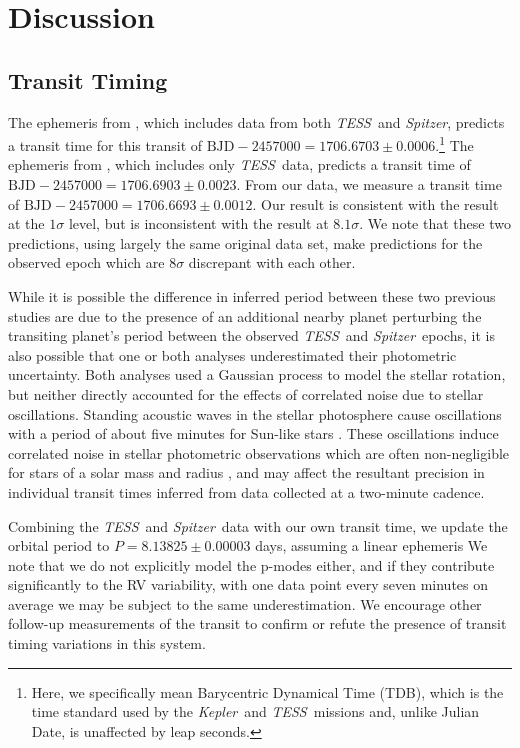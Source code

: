 \documentclass[twocolumn]{aastex63}
\newcommand{\kep}{{\it Kepler}}
\newcommand{\tess}{{\it TESS}}
\newcommand{\spitz}{{\it Spitzer}}
\begin{document}
\section{Discussion}
\label{sec:discussion}




\subsection{Transit Timing}

The ephemeris from \citet{Newton19}, which includes data from both \tess\ and \spitz, predicts a transit time for this transit of $\textrm{BJD}- 2457000 = 1706.6703 \pm 0.0006$.\footnote{Here, we specifically mean Barycentric Dynamical Time (TDB), which is the time standard used by the \kep\ and \tess\ missions and, unlike Julian Date, is unaffected by leap seconds.}
The ephemeris from \citet{Benatti19}, which includes only \tess\ data, predicts a transit time of  $\textrm{BJD}- 2457000 = 1706.6903 \pm 0.0023$. 
From our data, we measure a transit time of $\textrm{BJD}- 2457000 = 1706.6693 \pm  0.0012$. 
Our result is consistent with the \citet{Newton19} result at the $1\sigma$ level, but is inconsistent with the \citet{Benatti19} result at $8.1\sigma$.
We note that these two predictions, using largely the same original data set, make predictions for the observed epoch which are $8\sigma$ discrepant with each other. 

While it is possible the difference in inferred period between these two previous studies are due to the presence of an additional nearby planet perturbing the transiting planet's period between the observed \tess\ and \spitz\ epochs, it is also possible that one or both analyses underestimated their photometric uncertainty. 
Both analyses used a Gaussian process to model the stellar rotation, but neither directly accounted for the effects of correlated noise due to stellar oscillations.
Standing acoustic waves in the stellar photosphere cause oscillations with a period of about five minutes for Sun-like stars \citep{Deubner75}. These oscillations induce correlated noise in stellar photometric observations which are often non-negligible for stars of a solar mass and radius \citep{Chaplin13}, and may affect the resultant precision in individual transit times inferred from data collected at a two-minute cadence. 



Combining the \tess\ and \spitz\ data with our own transit time, we update the orbital period to $P= 8.13825 \pm 0.00003$ days, assuming a linear ephemeris
We note that we do not explicitly model the p-modes either, and if they contribute significantly to the RV variability, with one data point every seven minutes on average we may be subject to the same underestimation.
We encourage other follow-up measurements of the transit to confirm or refute the presence of transit timing variations in this system.
\end{document}
